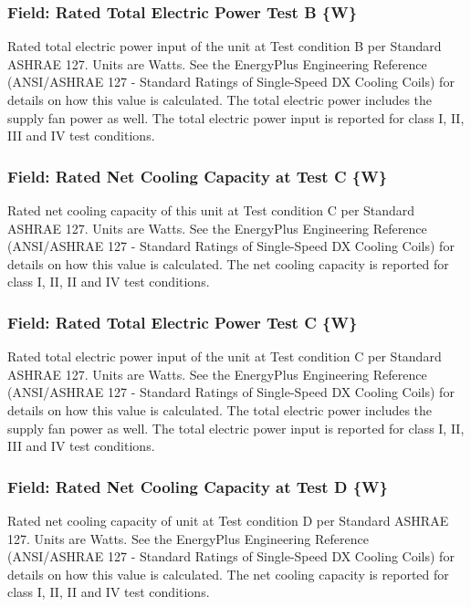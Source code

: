 \subsubsection{Field: Rated Total Electric Power Test B \{W\}}\label{field-rated-total-electric-power-test-b-w}

Rated total electric power input of the unit at Test condition B per Standard ASHRAE 127. Units are Watts. See the EnergyPlus Engineering Reference (ANSI/ASHRAE 127 - Standard Ratings of Single-Speed DX Cooling Coils) for details on how this value is calculated. The total electric power includes the supply fan power as well. The total electric power input is reported for class I, II, III and IV test conditions.

\subsubsection{Field: Rated Net Cooling Capacity at Test C \{W\}}\label{field-rated-net-cooling-capacity-at-test-c-w}

Rated net cooling capacity of this unit at Test condition C per Standard ASHRAE 127. Units are Watts. See the EnergyPlus Engineering Reference (ANSI/ASHRAE 127 - Standard Ratings of Single-Speed DX Cooling Coils) for details on how this value is calculated. The net cooling capacity is reported for class I, II, II and IV test conditions.

\subsubsection{Field: Rated Total Electric Power Test C \{W\}}\label{field-rated-total-electric-power-test-c-w}

Rated total electric power input of the unit at Test condition C per Standard ASHRAE 127. Units are Watts. See the EnergyPlus Engineering Reference (ANSI/ASHRAE 127 - Standard Ratings of Single-Speed DX Cooling Coils) for details on how this value is calculated. The total electric power includes the supply fan power as well. The total electric power input is reported for class I, II, III and IV test conditions.

\subsubsection{Field: Rated Net Cooling Capacity at Test D \{W\}}\label{field-rated-net-cooling-capacity-at-test-d-w}

Rated net cooling capacity of unit at Test condition D per Standard ASHRAE 127. Units are Watts. See the EnergyPlus Engineering Reference (ANSI/ASHRAE 127 - Standard Ratings of Single-Speed DX Cooling Coils) for details on how this value is calculated. The net cooling capacity is reported for class I, II, II and IV test conditions.

